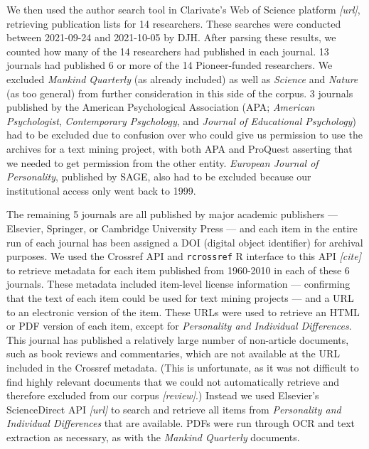 \documentclass[12pt]{article}
\begin{document}
We then used the author search tool in Clarivate's Web of Science platform \emph{{[}url{]}}, retrieving publication lists for 14 researchers. These searches were conducted between 2021-09-24 and 2021-10-05 by DJH. After parsing these results, we counted how many of the 14 researchers had published in each journal. 13 journals had published 6 or more of the 14 Pioneer-funded researchers. We excluded \emph{Mankind Quarterly} (as already included) as well as \emph{Science} and \emph{Nature} (as too general) from further consideration in this side of the corpus. 3 journals published by the American Psychological Association (APA; \emph{American Psychologist}, \emph{Contemporary Psychology}, and \emph{Journal of Educational Psychology}) had to be excluded due to confusion over who could give us permission to use the archives for a text mining project, with both APA and ProQuest asserting that we needed to get permission from the other entity. \emph{European Journal of Personality}, published by SAGE, also had to be excluded because our institutional access only went back to 1999.

The remaining 5 journals are all published by major academic publishers --- Elsevier, Springer, or Cambridge University Press --- and each item in the entire run of each journal has been assigned a DOI (digital object identifier) for archival purposes. We used the Crossref API and \texttt{rcrossref} R interface to this API \emph{{[}cite{]}} to retrieve metadata for each item published from 1960-2010 in each of these 6 journals. These metadata included item-level license information --- confirming that the text of each item could be used for text mining projects --- and a URL to an electronic version of the item. These URLs were used to retrieve an HTML or PDF version of each item, except for \emph{Personality and Individual Differences}. This journal has published a relatively large number of non-article documents, such as book reviews and commentaries, which are not available at the URL included in the Crossref metadata. (This is unfortunate, as it was not difficult to find highly relevant documents that we could not automatically retrieve and therefore excluded from our corpus \emph{{[}review{]}}.) Instead we used Elsevier's ScienceDirect API \emph{{[}url{]}} to search and retrieve all items from \emph{Personality and Individual Differences} that are available. PDFs were run through OCR and text extraction as necessary, as with the \emph{Mankind Quarterly} documents.
\end{document}
